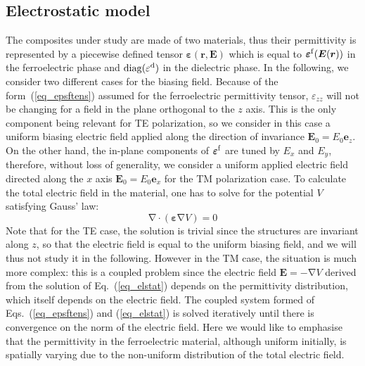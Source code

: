 \documentclass[%
 aip,
 amsmath,amssymb,
 reprint,%
]{revtex4-1}
\newcommand{\B}{\boldsymbol}
\newcommand{\tens}[1]{\B{#1}}
\newcommand{\grad}{\B{\mathrm{\nabla}}}
\renewcommand{\div}{\B{\mathrm{\nabla\cdotp}}}
\newcommand{\epsftens}{\tens{\varepsilon}^{\rm f}}
\newcommand{\epstens}{\tens{\varepsilon}}
\newcommand{\epsd}{\varepsilon^{\rm d}}
\newcommand{\equ}[1]{Eq.~(\ref{#1})}
\newcommand{\co}[1]{#1}
\begin{document}
\subsection{Electrostatic model}
The composites under study are made of two materials, thus their permittivity
is represented by a piecewise defined tensor $\epstens(\B r, \B E)$ which is
equal to $\epsftens(\B E(\B r))$ in the ferroelectric phase and ${\rm diag}(\epsd)$
in the dielectric phase.
In the following, we consider two different cases for the biasing field.
Because of the form~(\ref{eq_epsftens}) assumed for the ferroelectric permittivity
tensor, $\varepsilon_{zz}$ will not be changing for a field in the plane orthogonal
to the $z$ axis. This is the only component
being relevant for TE polarization, so we consider in this case a uniform biasing
electric field applied along the direction of invariance $\B E_0 = E_{0} \B e_z$.
On the other hand,
the in-plane components of $\epsftens$ are tuned by $E_x$ and $E_y$, therefore,
without loss of generality,
we consider a uniform applied electric field directed along the $x$ axis
$\B E_0 = E_{0} \B e_x$ for the TM polarization case.
To calculate the total electric field in the material, \co{one
has to solve for the potential $V$ satisfying Gauss' law:}
\begin{equation}
 \div (\epstens \grad V) = 0
 \label{eq_elstat}
\end{equation}
Note that for the TE case, the solution is trivial since the structures
are invariant along $z$, so that the electric field is equal to the uniform biasing field, and
we will thus not study it in the following.
However in the TM case, the situation is much more complex: this is a coupled problem since the
electric field $\B E=-\grad V$ derived from the
solution of \equ{eq_elstat} depends on the permittivity distribution, which
itself depends on the electric field.
The coupled system formed
of Eqs.~(\ref{eq_epsftens}) and (\ref{eq_elstat}) is solved iteratively until there
is convergence on the norm of the electric field.
Here we would like to emphasise that the permittivity in the ferroelectric material, although
uniform initially, is spatially varying due to the non-uniform distribution
of the total electric field.\\



\end{document}
